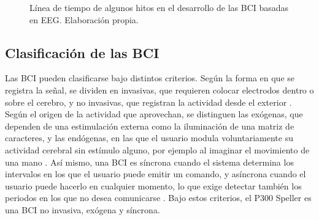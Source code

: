 \begin{figure}[htbp]
\centering
{}
\caption{Línea de tiempo de algunos hitos en el desarrollo de las BCI basadas en EEG. Elaboración
propia.}
\label{fig:historia}
\end{figure}

\subsection{Clasificación de las BCI}

Las BCI pueden clasificarse bajo distintos criterios. Según la forma en que se registra la señal,
se dividen en invasivas, que requieren colocar electrodos dentro o sobre el cerebro, y no
invasivas, que registran la actividad desde el exterior \cite{nicolasalonso2012}. Según el origen
de la actividad que aprovechan, se distinguen las exógenas, que dependen de una estimulación
externa como la iluminación de una matriz de caracteres, y las endógenas, en las que el usuario
modula voluntariamente su actividad cerebral sin estímulo alguno, por ejemplo al imaginar el
movimiento de una mano \cite{nicolasalonso2012}. Así mismo, una BCI es síncrona cuando el sistema
determina los intervalos en los que el usuario puede emitir un comando, y asíncrona cuando el
usuario puede hacerlo en cualquier momento, lo que exige detectar también los periodos en los que
no desea comunicarse \cite{wolpaw2012}. Bajo estos criterios, el P300 Speller es una BCI no
invasiva, exógena y síncrona.

